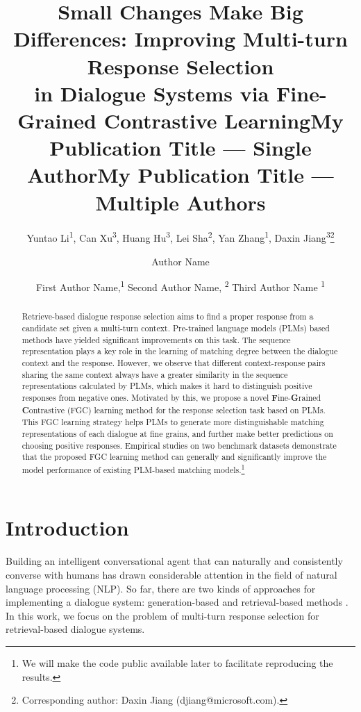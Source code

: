 \documentclass[letterpaper]{article} \usepackage{aaai22}  \usepackage{times}  \usepackage{helvet}  \usepackage{courier}  \usepackage[hyphens]{url}  \usepackage{graphicx} \urlstyle{rm} \def\UrlFont{\rm}  \usepackage{natbib}  \usepackage{caption} \DeclareCaptionStyle{ruled}{labelfont=normalfont,labelsep=colon,strut=off} \frenchspacing  \setlength{\pdfpagewidth}{8.5in}  \setlength{\pdfpageheight}{11in}  \usepackage{algorithm}
\title{Small Changes Make Big Differences: Improving Multi-turn Response Selection \\in Dialogue Systems via Fine-Grained Contrastive Learning}
\author{
Yuntao Li\textsuperscript{1},
Can Xu\textsuperscript{3},
Huang Hu\textsuperscript{3},
Lei Sha\textsuperscript{2},
Yan Zhang\textsuperscript{1},
Daxin Jiang\textsuperscript{3}\thanks{Corresponding author: Daxin Jiang (djiang@microsoft.com).}\\
}
\title{My Publication Title --- Single Author}
\author {
    Author Name
}
\title{My Publication Title --- Multiple Authors}
\author {
First Author Name,\textsuperscript{\rm 1}
    Second Author Name, \textsuperscript{\rm 2}
    Third Author Name \textsuperscript{\rm 1}
}
\begin{document}
\maketitle

\begin{abstract}
Retrieve-based dialogue response selection aims to find a proper response from a candidate set given a multi-turn context. Pre-trained language models (PLMs) based methods have yielded significant improvements on this task. The sequence representation plays a key role in the learning of matching degree between the dialogue context and the response. However, we observe that different context-response pairs sharing the same context always have a greater similarity in the sequence representations calculated by PLMs, which makes it hard to distinguish positive responses from negative ones. Motivated by this, we propose a novel \textbf{F}ine-\textbf{G}rained \textbf{C}ontrastive (FGC) learning method for the response selection task based on PLMs. This FGC learning strategy helps PLMs to generate more distinguishable matching representations of each dialogue at fine grains, and further make better predictions on choosing positive responses. Empirical studies on two benchmark datasets demonstrate that the proposed FGC learning method can generally and significantly improve the model performance of existing PLM-based matching models.\footnote{We will make the code public available later to facilitate reproducing the results.}
\end{abstract}

\section{Introduction}

Building an intelligent conversational agent that can naturally and consistently converse with humans has drawn considerable attention in the field of natural language processing (NLP). So far, there are two kinds of approaches for implementing a dialogue system: generation-based \cite{serban2016building,vinyals2015neural} and retrieval-based methods \cite{lowe2015ubuntu,wu2016sequential,zhou2018multi}. 
In this work, we focus on the problem of multi-turn response selection for retrieval-based dialogue systems. 
\end{document}
